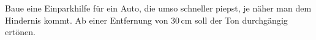%	
%	
%	

%	
%	

\bigskip
\begin{projekt} \label{proj:einparkhilfe}
	Baue eine Einparkhilfe für ein Auto, die umso schneller piepst, je näher man dem Hindernis kommt. Ab einer Entfernung von 30\,cm soll der Ton durchgängig ertönen.
\end{projekt}

